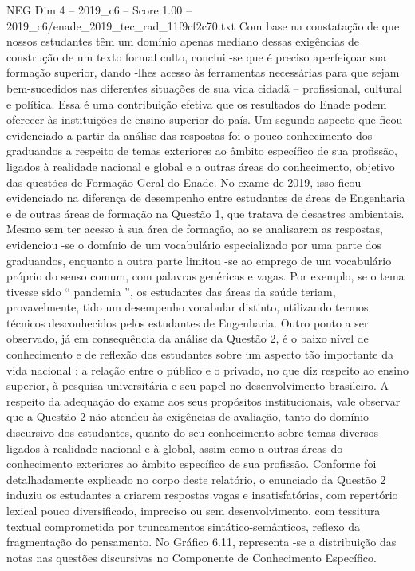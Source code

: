 \begin{textsample}{NEG Dim 4 – 2019\_c6 – Score 1.00 – 2019\_c6/enade\_2019\_tec\_rad\_11f9cf2c70.txt}
Com base na constatação de que nossos estudantes têm um domínio apenas mediano dessas exigências de construção de um texto formal culto, conclui -se que é preciso aperfeiçoar sua formação superior, dando -lhes acesso às ferramentas necessárias para que sejam bem-sucedidos nas diferentes situações de sua vida cidadã – profissional, cultural e política.
Essa é uma contribuição efetiva que os resultados do Enade podem oferecer às instituições de ensino superior do país.
Um segundo aspecto que ficou evidenciado a partir da análise das respostas foi o pouco conhecimento dos graduandos a respeito de temas exteriores ao âmbito específico de sua profissão, ligados à realidade nacional e global e a outras áreas do conhecimento, objetivo das questões de Formação Geral do Enade.
No exame de 2019, isso ficou evidenciado na diferença de desempenho entre estudantes de áreas de Engenharia e de outras áreas de formação na Questão 1, que tratava de desastres ambientais.
Mesmo sem ter acesso à sua área de formação, ao se analisarem as respostas, evidenciou -se o domínio de um vocabulário especializado por uma parte dos graduandos, enquanto a outra parte limitou -se ao emprego de um vocabulário próprio do senso comum, com palavras genéricas e vagas.
Por exemplo, se o tema tivesse sido “ pandemia ”, os estudantes das áreas da saúde teriam, provavelmente, tido um desempenho vocabular distinto, utilizando termos técnicos desconhecidos pelos estudantes de Engenharia.
Outro ponto a ser observado, já em consequência da análise da Questão 2, é o baixo nível de conhecimento e de reflexão dos estudantes sobre um aspecto tão importante da vida nacional : a relação entre o público e o privado, no que diz respeito ao ensino superior, à pesquisa universitária e seu papel no desenvolvimento brasileiro.
A respeito da adequação do exame aos seus propósitos institucionais, vale observar que a Questão 2 não atendeu às exigências de avaliação, tanto do domínio discursivo dos estudantes, quanto do seu conhecimento sobre temas diversos ligados à realidade nacional e à global, assim como a outras áreas do conhecimento exteriores ao âmbito específico de sua profissão.
Conforme foi detalhadamente explicado no corpo deste relatório, o enunciado da Questão 2 induziu os estudantes a criarem respostas vagas e insatisfatórias, com repertório lexical pouco diversificado, impreciso ou sem desenvolvimento, com tessitura textual comprometida por truncamentos sintático-semânticos, reflexo da fragmentação do pensamento.
No Gráfico 6.11, representa -se a distribuição das notas nas questões discursivas no Componente de Conhecimento Específico.

\end{textsample}
